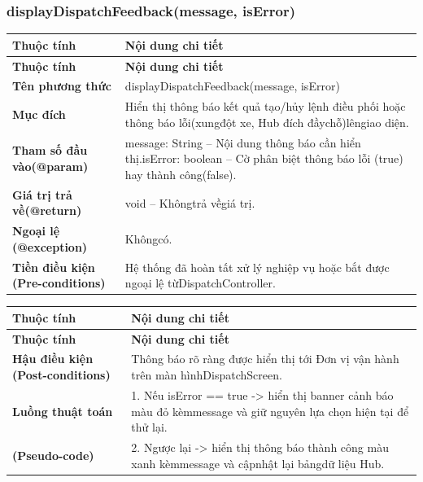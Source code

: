 \subsubsection{displayDispatchFeedback(message, isError)}
\begin{longtable}{|L{0.24\textwidth}|L{0.70\textwidth}|}
\hline
\textbf{Thuộc tính} & \textbf{Nội dung chi tiết} \\
\hline
\endfirsthead
\hline
\textbf{Thuộc tính} & \textbf{Nội dung chi tiết} \\
\hline
\endhead
\textbf{Tên phương thức} & displayDispatchFeedback(message, isError) \\
\hline
\textbf{Mục đích} & Hiển thị thông báo kết quả tạo/hủy lệnh điều phối hoặc thông báo lỗi\newline (xungđột xe, Hub đích đầychỗ)lêngiao diện. \\
\hline
\textbf{Tham số đầu vào}\newline \textbf{(@param)} & message: String – Nội dung thông báo cần hiển thị.\newline isError: boolean – Cờ phân biệt thông báo lỗi (true) hay thành công\newline (false). \\
\hline
\textbf{Giá trị trả về(@return)} & void – Khôngtrả vềgiá trị. \\
\hline
\textbf{Ngoại lệ (@exception)} & Khôngcó. \\
\hline
\textbf{Tiền điều kiện (Pre-}\newline \textbf{conditions)} & Hệ thống đã hoàn tất xử lý nghiệp vụ hoặc bắt được ngoại lệ từ\newline DispatchController. \\
\hline
\end{longtable}
\vspace{-0.5\baselineskip}
\begin{longtable}{|L{0.24\textwidth}|L{0.70\textwidth}|}
\hline
\textbf{Thuộc tính} & \textbf{Nội dung chi tiết} \\
\hline
\endfirsthead
\hline
\textbf{Thuộc tính} & \textbf{Nội dung chi tiết} \\
\hline
\endhead
\textbf{Hậu điều kiện (Post-}\newline \textbf{conditions)} & Thông báo rõ ràng được hiển thị tới Đơn vị vận hành trên màn hình\newline DispatchScreen. \\
\hline
\textbf{Luồng thuật toán} & 1. Nếu isError == true -> hiển thị banner cảnh báo màu đỏ kèm\newline message và giữ nguyên lựa chọn hiện tại để thử lại. \\
\hline
\textbf{(Pseudo-code)} & 2. Ngược lại -> hiển thị thông báo thành công màu xanh kèm\newline message và cậpnhật lại bảngdữ liệu Hub. \\
\hline
\end{longtable}
\vspace{-0.5\baselineskip}
